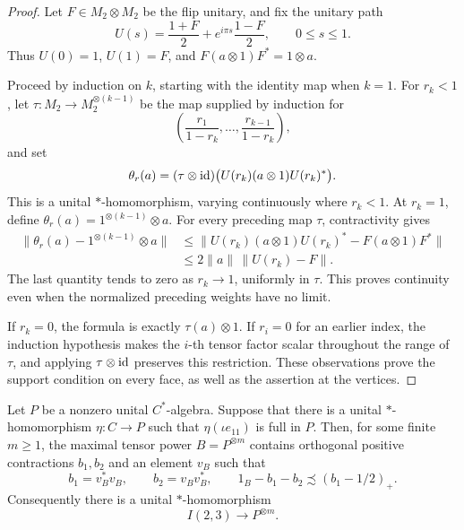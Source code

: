 \begin{proof}
Let \(F\in M_2\otimes M_2\) be the flip unitary, and fix the unitary path
\[
U(s)=\frac{1+F}{2}+e^{i\pi s}\frac{1-F}{2},
\qquad 0\le s\le1.
\]
Thus \(U(0)=1\), \(U(1)=F\), and
\(F(a\otimes1)F^*=1\otimes a\).

Proceed by induction on \(k\), starting with the identity map when
\(k=1\). For \(r_k<1\), let \(\tau:M_2\to M_2^{\otimes(k-1)}\) be the
map supplied by induction for
\[
\left(\frac{r_1}{1-r_k},\ldots,\frac{r_{k-1}}{1-r_k}\right),
\]
and set
\[
\theta_r(a)
=(\tau\otimes\mathrm{id})
\bigl(U(r_k)(a\otimes1)U(r_k)^*\bigr).
\]
This is a unital \(*\)-homomorphism, varying continuously where
\(r_k<1\). At \(r_k=1\), define
\(\theta_r(a)=1^{\otimes(k-1)}\otimes a\). For every preceding map
\(\tau\), contractivity gives
\[
\begin{aligned}
\|\theta_r(a)-1^{\otimes(k-1)}\otimes a\|
&\le
\|U(r_k)(a\otimes1)U(r_k)^*-F(a\otimes1)F^*\|\\
&\le 2\|a\|\,\|U(r_k)-F\|.
\end{aligned}
\]
The last quantity tends to zero as \(r_k\to1\), uniformly in \(\tau\).
This proves continuity even when the normalized preceding weights
have no limit.

If \(r_k=0\), the formula is exactly \(\tau(a)\otimes1\).
If \(r_i=0\) for an earlier index, the induction hypothesis makes
the \(i\)-th tensor factor scalar throughout the range of \(\tau\),
and applying \(\tau\otimes\mathrm{id}\) preserves this restriction.
These observations prove the support condition on every face, as well
as the assertion at the vertices.
\end{proof}

\begin{proposition}\label{prop:cone-drop}
Let \(P\) be a nonzero unital \(C^*\)-algebra. Suppose that there is a
unital \(*\)-homomorphism \(\eta:C\to P\) such that
\(\eta(\iota e_{11})\) is full in \(P\). Then, for some finite
\(m\ge1\), the maximal tensor power \(B=P^{\otimes m}\) contains
orthogonal positive contractions \(b_1,b_2\) and an element \(v_B\)
such that
\[
b_1=v_B^*v_B,\qquad b_2=v_Bv_B^*,\qquad
1_B-b_1-b_2\precsim(b_1-1/2)_+.
\]
Consequently there is a unital \(*\)-homomorphism
\[
I(2,3)\longrightarrow P^{\otimes m}.
\]
\end{proposition}

